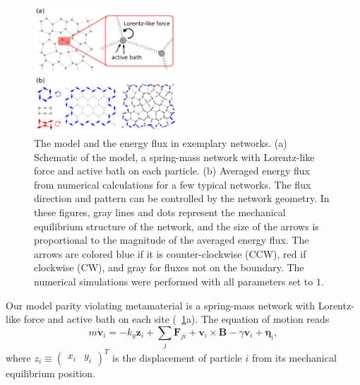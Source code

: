 \documentclass[
 preprint,
 preprintnumbers,
 amsmath,amssymb,
 aps,
 pre,
 longbibliography,
 superscriptaddress,
 10pt, twocolumn
]{revtex4-1}
\begin{document}
\begin{figure}[ht]
	\centering
	\includegraphics[width=0.48\textwidth]{model_and_result.pdf}
    \caption{
    The model and the energy flux in exemplary networks.
    (a) Schematic of the model, a spring-mass network with Lorentz-like force and active bath on each particle.
    (b) Averaged energy flux from numerical calculations for a few typical networks. The flux direction and pattern can be controlled by the network geometry. In these figures, gray lines and dots represent the mechanical equilibrium structure of the network, and the size of the arrows is proportional to the magnitude of the averaged energy flux. The arrows are colored blue if it is counter-clockwise (CCW), red if clockwise (CW), and gray for fluxes not on the boundary. The numerical simulations were performed with all parameters set to $1$.
    }
    \label{fig:model_and_result}
\end{figure}

Our model parity violating metamaterial is a spring-mass network with Lorentz-like force and active bath \cite{Fodor2016HowFar} on each site (\figurename~\ref{fig:model_and_result}a).
The equation of motion reads
\begin{equation} \label{eqn:GLE_single}
    m\dot{\bm{v}}_i = -k_g \bm{z}_i + \sum_j\bm{F}_{ji} + \bm{v}_i\times\bm{B} - \gamma\bm{v}_i + \bm{\eta}_i ,
\end{equation}
where $z_i \equiv \begin{pmatrix} x_i & y_i \end{pmatrix}^T$ is the displacement of particle $i$ from its mechanical equilibrium position.
\end{document}
